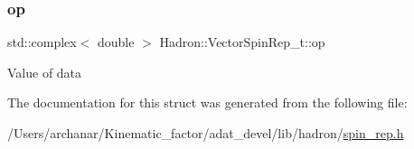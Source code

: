 \subsubsection{\texorpdfstring{op}{op}}
{\footnotesize\ttfamily std\+::complex$<$ double $>$ Hadron\+::\+Vector\+Spin\+Rep\+\_\+t\+::op}

Value of data 

The documentation for this struct was generated from the following file\+:\begin{DoxyCompactItemize}
\item 
/\+Users/archanar/\+Kinematic\+\_\+factor/adat\+\_\+devel/lib/hadron/\mbox{\hyperlink{lib_2hadron_2spin__rep_8h}{spin\+\_\+rep.\+h}}\end{DoxyCompactItemize}
